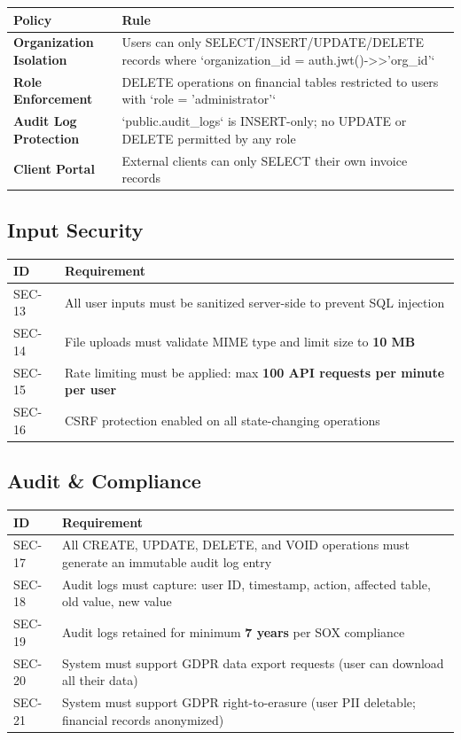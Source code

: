 \documentclass[journal, a4paper, onecolumn, 12pt]{IEEEtran}
\begin{document}
\begin{longtable}{|p{}|p{}|}
\hline
Policy & Rule \\ \hline
\hline
\textbf{Organization Isolation} & Users can only SELECT/INSERT/UPDATE/DELETE records where `organization\_id = auth.jwt()->>'org\_id'` \\ \hline
\textbf{Role Enforcement} & DELETE operations on financial tables restricted to users with `role = 'administrator'` \\ \hline
\textbf{Audit Log Protection} & `public.audit\_logs` is INSERT-only; no UPDATE or DELETE permitted by any role \\ \hline
\textbf{Client Portal} & External clients can only SELECT their own invoice records \\ \hline
\end{longtable}
\subsection{Input Security}

\begin{longtable}{|p{}|p{}|}
\hline
ID & Requirement \\ \hline
\hline
SEC-13 & All user inputs must be sanitized server-side to prevent SQL injection \\ \hline
SEC-14 & File uploads must validate MIME type and limit size to \textbf{10 MB} \\ \hline
SEC-15 & Rate limiting must be applied: max \textbf{100 API requests per minute per user} \\ \hline
SEC-16 & CSRF protection enabled on all state-changing operations \\ \hline
\end{longtable}
\subsection{Audit \& Compliance}

\begin{longtable}{|p{}|p{}|}
\hline
ID & Requirement \\ \hline
\hline
SEC-17 & All CREATE, UPDATE, DELETE, and VOID operations must generate an immutable audit log entry \\ \hline
SEC-18 & Audit logs must capture: user ID, timestamp, action, affected table, old value, new value \\ \hline
SEC-19 & Audit logs retained for minimum \textbf{7 years} per SOX compliance \\ \hline
SEC-20 & System must support GDPR data export requests (user can download all their data) \\ \hline
SEC-21 & System must support GDPR right-to-erasure (user PII deletable; financial records anonymized) \\ \hline
\end{longtable}
\end{document}
